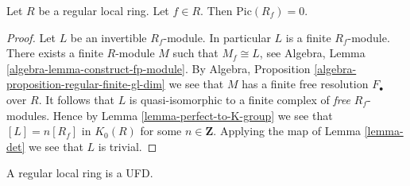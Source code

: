 \begin{lemma}
\label{lemma-regular-local-Pic-zero}
Let $R$ be a regular local ring. Let $f \in R$.
Then $\text{Pic}(R_f) = 0$.
\end{lemma}

\begin{proof}
Let $L$ be an invertible $R_f$-module. In particular $L$ is
a finite $R_f$-module. There exists a finite $R$-module
$M$ such that $M_f \cong L$, see
Algebra, Lemma \ref{algebra-lemma-construct-fp-module}.
By Algebra, Proposition \ref{algebra-proposition-regular-finite-gl-dim}
we see that $M$ has a finite free resolution $F_\bullet$ over $R$.
It follows that $L$ is quasi-isomorphic to a finite complex
of {\it free} $R_f$-modules. Hence by
Lemma \ref{lemma-perfect-to-K-group} we see that
$[L] = n[R_f]$ in $K_0(R)$ for some $n \in \mathbf{Z}$.
Applying the map of Lemma \ref{lemma-det}
we see that $L$ is trivial.
\end{proof}

\begin{lemma}
\label{lemma-regular-local-UFD}
A regular local ring is a UFD.
\end{lemma}

